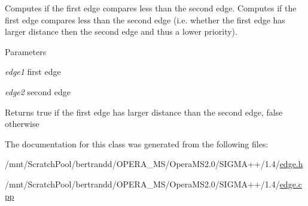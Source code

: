 Computes if the first edge compares less than the second edge. Computes if the first edge compares less than the second edge (i.e. whether the first edge has larger distance then the second edge and thus a lower priority).


\begin{DoxyParams}{Parameters}
\item[{\em edge1}]first edge \item[{\em edge2}]second edge \end{DoxyParams}
\begin{DoxyReturn}{Returns}
true if the first edge has larger distance than the second edge, false otherwise 
\end{DoxyReturn}


The documentation for this class was generated from the following files:\begin{DoxyCompactItemize}
\item 
/mnt/ScratchPool/bertrandd/OPERA\_\-MS/OperaMS2.0/SIGMA++/1.4/\hyperlink{edge_8h}{edge.h}\item 
/mnt/ScratchPool/bertrandd/OPERA\_\-MS/OperaMS2.0/SIGMA++/1.4/\hyperlink{edge_8cpp}{edge.cpp}\end{DoxyCompactItemize}

